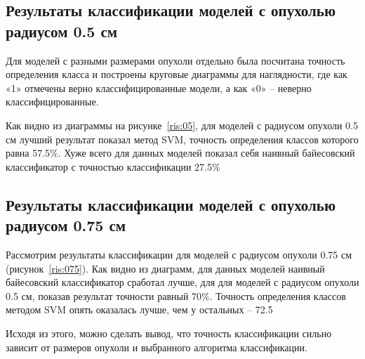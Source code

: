 \subsection{Результаты классификации моделей с опухолью радиусом 0.5 см}
Для моделей с разными размерами опухоли отдельно была посчитана точность определения класса и построены круговые диаграммы для наглядности, где как «1» отмечены верно классифицированные модели, а как «0» -- неверно классифицированные.
\par
Как видно из диаграммы на рисунке~\ref{ris:05}, для моделей с радиусом опухоли 0.5 см лучший результат показал метод SVM, точность определения классов которого равна 57.5\%. Хуже всего для данных моделей показал себя наивный байесовский классификатор с точностью классификации 27.5\%

\subsection{Результаты классификации моделей с опухолью радиусом 0.75 см}
Рассмотрим результаты классификации для моделей с радиусом опухоли 0.75 см (рисунок~\ref{ris:075}). Как видно из диаграмм, для данных моделей наивный байесовский классификатор сработал лучше, для для моделей с радиусом опухоли 0.5 см, показав результат точности равный 70\%. Точность определения классов методом SVM опять оказалась лучше, чем у остальных -- 72.5%
\par
Исходя из этого, можно сделать вывод, что точность классификации сильно зависит от размеров опухоли и выбранного алгоритма классификации.



